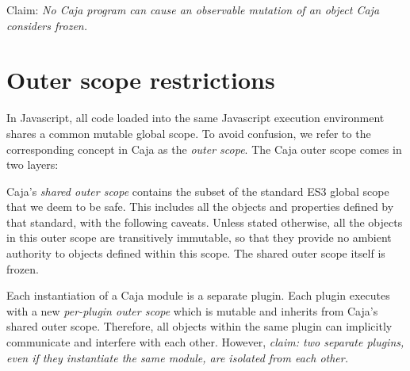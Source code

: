 \documentclass[letterpaper,twocolumn,10pt]{article}
\begin{document}
Claim: \emph{No Caja program can cause an observable mutation of an object
Caja considers frozen.}


\section{Outer scope restrictions}

In Javascript, all code loaded into the same Javascript execution environment 
shares a common mutable global scope. To avoid confusion, we refer to the 
corresponding concept in Caja as the \emph{outer scope}. The Caja outer scope
 comes in two layers:

Caja's \emph{shared outer scope} contains the subset of the standard ES3 
global scope that we deem to be safe. This includes all the objects and 
properties defined by that standard, with the following caveats. Unless 
stated otherwise, all the objects in this outer scope are transitively 
immutable, so that they provide no ambient authority to objects defined 
within this scope. The shared outer scope itself is frozen.

Each instantiation of a Caja module is a separate plugin. Each plugin 
executes with a new \emph{per-plugin outer scope} which is mutable and 
inherits from Caja's shared outer scope. Therefore, all objects within the 
same plugin can implicitly communicate and interfere with each other. 
However, \emph{claim: two separate plugins, even if they instantiate the same 
module, are isolated from each other.}
\end{document}
